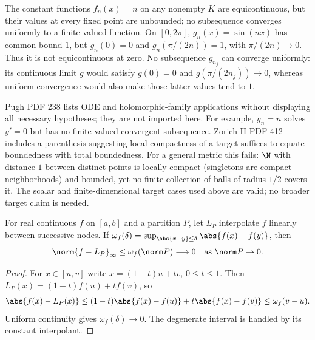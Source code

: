 \begin{example}
The constant functions $f_n(x)=n$ on any nonempty $K$ are equicontinuous, but their values at every fixed point are unbounded; no subsequence converges uniformly to a finite-valued function. On $[0,2\pi]$, $g_n(x)=\sin(nx)$ has common bound $1$, but $g_n(0)=0$ and $g_n(\pi/(2n))=1$, with $\pi/(2n)\to0$. Thus it is not equicontinuous at zero. No subsequence $g_{n_j}$ can converge uniformly: its continuous limit $g$ would satisfy $g(0)=0$ and $g(\pi/(2n_j))\to0$, whereas uniform convergence would also make those latter values tend to $1$.
\end{example}
\begin{remark}
Pugh PDF 238 lists ODE and holomorphic-family applications without displaying all necessary hypotheses; they are not imported here. For example, $y_n=n$ solves $y'=0$ but has no finite-valued convergent subsequence. Zorich II PDF 412 includes a parenthesis suggesting local compactness of a target suffices to equate boundedness with total boundedness. For a general metric this fails: $\N$ with distance $1$ between distinct points is locally compact (singletons are compact neighborhoods) and bounded, yet no finite collection of balls of radius $1/2$ covers it. The scalar and finite-dimensional target cases used above are valid; no broader target claim is needed.
\end{remark}

\begin{theorem}
For real continuous $f$ on $[a,b]$ and a partition $P$, let $L_P$ interpolate $f$ linearly between successive nodes. If $\omega_f(\delta)=\sup_{\abs{x-y}\leq\delta}\abs{f(x)-f(y)}$, then
\[\norm{f-L_P}_\infty\leq\omega_f(\norm P)\longrightarrow0\quad\text{as }\norm P\to0.\]
\end{theorem}
\begin{proof}
For $x\in[u,v]$ write $x=(1-t)u+tv$, $0\leq t\leq1$. Then $L_P(x)=(1-t)f(u)+tf(v)$, so
\[\abs{f(x)-L_P(x)}\leq(1-t)\abs{f(x)-f(u)}+t\abs{f(x)-f(v)}\leq\omega_f(v-u).\]
Uniform continuity gives $\omega_f(\delta)\to0$. The degenerate interval is handled by its constant interpolant.
\end{proof}


